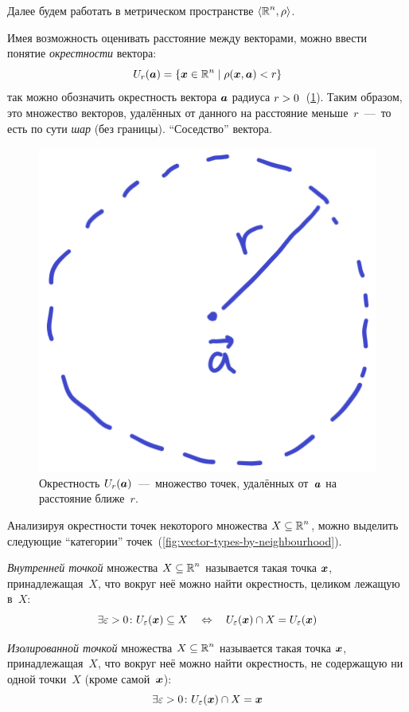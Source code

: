 \documentclass[a4paper,12pt]{article}
\begin{document}
  Далее будем работать в метрическом пространстве $\langle\operatorname{\mathbb R}^n, \rho\rangle$.

  Имея возможность оценивать расстояние между векторами, можно ввести понятие \emph{окрестности} вектора:
  \[
    U_{r}(\boldsymbol a) = \{\boldsymbol x \in \operatorname{\mathbb R}^n \mid \rho(\boldsymbol x, \boldsymbol a) < r\}
  \]
  так можно обозначить окрестность вектора $\boldsymbol a$ радиуса $r \hm> 0$~(\ref{fig:vector-neighbourhood}).
  Таким образом, это множество векторов, удалённых от данного на расстояние меньше~$r$~---~то есть по сути \emph{шар} (без границы).
  ``Соседство'' вектора.

  \begin{figure}[ht]
    \centering
  
    \includegraphics[width=0.25\columnwidth]{vector-neighbourhood}
  
    \caption{
      Окрестность $U_{r}(\boldsymbol a)$~---~множество точек, удалённых от~$\boldsymbol a$ на расстояние ближе~$r$.
    }
    \label{fig:vector-neighbourhood}
  \end{figure}

  Анализируя окрестности точек некоторого множества $X \hm\subseteq \RR^n$, можно выделить следующие ``категории'' точек~(\ref{fig:vector-types-by-neighbourhood}).

  \begin{definition}
    \emph{Внутренней точкой} множества $X \subseteq \operatorname{\mathbb R}^n$ называется такая точка $\boldsymbol x$, принадлежащая~$X$, что вокруг неё можно найти окрестность, целиком лежащую в~$X$:
    \[
      \exists \varepsilon > 0\colon U_{\varepsilon}(\boldsymbol x) \subseteq X \quad\Leftrightarrow\quad U_{\varepsilon}(\boldsymbol x) \cap X = U_{\varepsilon}(\boldsymbol x)
    \]
  \end{definition}

  \begin{definition}
    \emph{Изолированной точкой} множества $X \subseteq \operatorname{\mathbb R}^n$ называется такая точка $\boldsymbol x$, принадлежащая~$X$, что вокруг неё можно найти окрестность, не содержащую ни одной точки~$X$ (кроме самой~$\boldsymbol x$):
    \[
      \exists \varepsilon > 0\colon U_{\varepsilon}(\boldsymbol x) \cap X = \boldsymbol x
    \]
  \end{definition}
\end{document}
